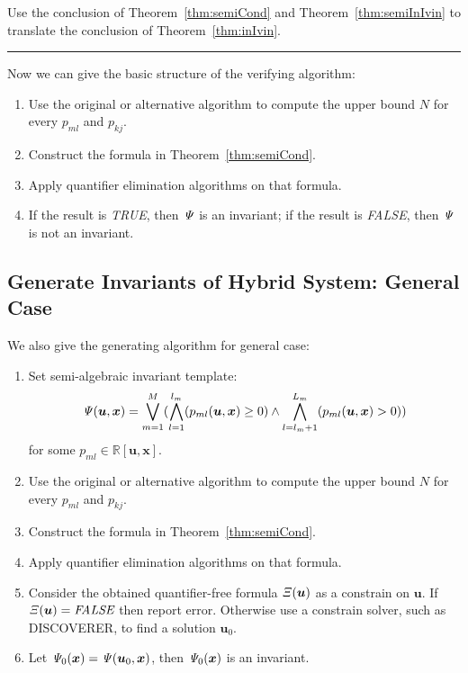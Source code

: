 \documentclass{jssc}
\newcommand{\rulex}{\hfill\rule{1mm}{3mm}}
\begin{document}
\proof
Use the conclusion of Theorem~\ref{thm:semiCond} and Theorem~\ref{thm:semiInIvin} to translate the conclusion of Theorem~\ref{thm:inIvin}.
\rulex

Now we can give the basic structure of the verifying algorithm:
\begin{enumerate}
	\item Use the original or alternative algorithm to compute the upper bound $N$ for every $p_{ml}$ and $p_{kj}$.
	\item Construct the formula in Theorem~\ref{thm:semiCond}.
	\item Apply quantifier elimination algorithms on that formula.
	\item If the result is \emph{TRUE}, then ${\it \Psi}$ is an invariant; if the result is \emph{FALSE}, then ${\it \Psi}$ is not an invariant.
\end{enumerate}

\subsection{Generate Invariants of Hybrid System: General Case}
We also give the generating algorithm for general case:
\begin{enumerate}
	\item Set semi-algebraic invariant template:
		\begin{equation*}
			{\it \Psi}(\boldsymbol{u}, \boldsymbol{x}) = \bigvee_{m=1}^M (\bigwedge_{l=1}^{l_m} (p_{ml}(\boldsymbol{u}, \boldsymbol{x})\geq 0) \wedge \bigwedge_{l=l_m+1}^{L_m} (p_{ml}(\boldsymbol{u}, \boldsymbol{x}) > 0))
		\end{equation*}
		for some $p_{ml} \in \mathbb{R}[\boldsymbol{u}, \boldsymbol{x}]$.
	\item Use the original or alternative algorithm to compute the upper bound $N$ for every $p_{ml}$ and $p_{kj}$.
	\item Construct the formula in Theorem~\ref{thm:semiCond}.
	\item Apply quantifier elimination algorithms on that formula.
	\item Consider the obtained quantifier-free formula ${\it \Xi}(\boldsymbol{u})$ as a constrain on $\boldsymbol{u}$. If ${\it \Xi}(\boldsymbol{u}) = \textit{FALSE}$ then report error. Otherwise use a constrain solver, such as DISCOVERER\cite{xia2007discoverer}, to find a solution $\boldsymbol{u}_0$.
	\item Let ${\it \Psi}_0(\boldsymbol{x}) = {\it \Psi}(\boldsymbol{u}_0, \boldsymbol{x})$, then ${\it \Psi}_0(\boldsymbol{x})$ is an invariant.
\end{enumerate}
\end{document}
